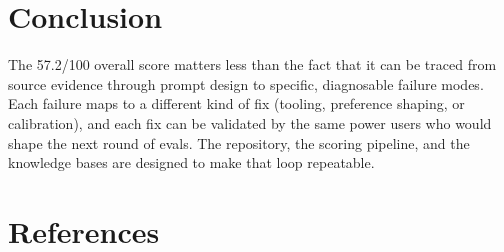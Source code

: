 \documentclass[11pt, a4paper]{article}
\begin{document}
\section{Conclusion}

The 57.2/100 overall score matters less than the fact that it can be traced from source evidence through prompt design to specific, diagnosable failure modes. Each failure maps to a different kind of fix (tooling, preference shaping, or calibration), and each fix can be validated by the same power users who would shape the next round of evals. The repository, the scoring pipeline, and the knowledge bases are designed to make that loop repeatable.

\clearpage
\section{References}
\end{document}
